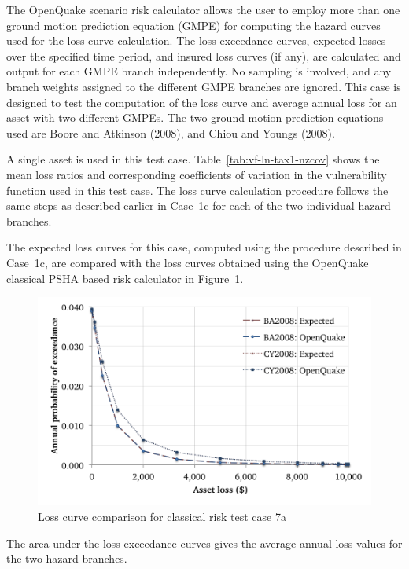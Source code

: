 The OpenQuake scenario risk calculator allows the user to employ more than one ground motion prediction equation (GMPE) for computing the hazard curves used for the loss curve calculation. The loss exceedance curves, expected losses over the specified time period, and insured loss curves (if any), are calculated and output for each GMPE branch independently. No sampling is involved, and any branch weights assigned to the different GMPE branches are ignored. This case is designed to test the computation of the loss curve and average annual loss for an asset with two different GMPEs. The two ground motion prediction equations used are Boore and Atkinson (2008), and Chiou and Youngs (2008).

A single asset is used in this test case. Table~\ref{tab:vf-ln-tax1-nzcov} shows the mean loss ratios and corresponding coefficients of variation in the vulnerability function used in this test case. The loss curve calculation procedure follows the same steps as described earlier in Case~1c for each of the two individual hazard branches.

The expected loss curves for this case, computed using the procedure described in Case~1c, are compared with the loss curves obtained using the OpenQuake classical PSHA based risk calculator in Figure~\ref{fig:lc-cr-7a}.

\begin{figure}[htbp]
\centering
\includegraphics[width=12cm]{qareport/figures/fig-lc-cr-7a}
\caption{Loss curve comparison for classical risk test case 7a}
\label{fig:lc-cr-7a}
\end{figure}

The area under the loss exceedance curves gives the average annual loss values for the two hazard branches.
